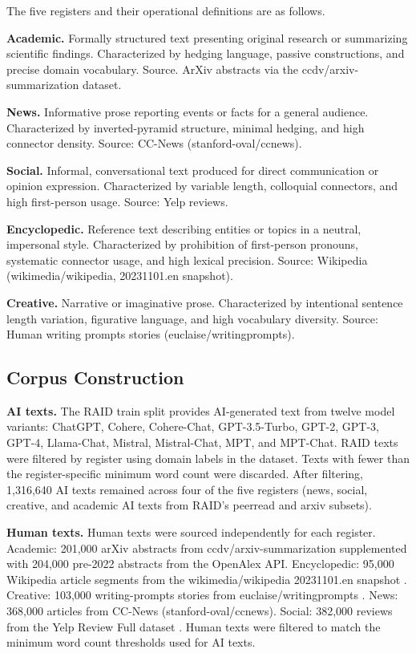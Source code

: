 \documentclass{article}
\begin{document}
The five registers and their operational definitions are as follows.

\textbf{Academic.} Formally structured text presenting original research or summarizing scientific findings. Characterized by hedging language, passive constructions, and precise domain vocabulary. Source. ArXiv abstracts via the ccdv/arxiv-summarization dataset.

\textbf{News.} Informative prose reporting events or facts for a general audience. Characterized by inverted-pyramid structure, minimal hedging, and high connector density. Source: CC-News (stanford-oval/ccnews).

\textbf{Social.} Informal, conversational text produced for direct communication or opinion expression. Characterized by variable length, colloquial connectors, and high first-person usage. Source: Yelp reviews.

\textbf{Encyclopedic.} Reference text describing entities or topics in a neutral, impersonal style. Characterized by prohibition of first-person pronouns, systematic connector usage, and high lexical precision. Source: Wikipedia (wikimedia/wikipedia, 20231101.en snapshot).

\textbf{Creative.} Narrative or imaginative prose. Characterized by intentional sentence length variation, figurative language, and high vocabulary diversity. Source: Human writing prompts stories (euclaise/writingprompts).

\subsection{Corpus Construction}

\textbf{AI texts.} The RAID train split \cite{ref4} provides AI-generated text from twelve model variants: ChatGPT, Cohere, Cohere-Chat, GPT-3.5-Turbo, GPT-2, GPT-3, GPT-4, Llama-Chat, Mistral, Mistral-Chat, MPT, and MPT-Chat. RAID texts were filtered by register using domain labels in the dataset. Texts with fewer than the register-specific minimum word count were discarded. After filtering, 1,316,640 AI texts remained across four of the five registers (news, social, creative, and academic AI texts from RAID's peerread and arxiv subsets).

\textbf{Human texts.} Human texts were sourced independently for each register. Academic: 201,000 arXiv abstracts from ccdv/arxiv-summarization \cite{ref15} supplemented with 204,000 pre-2022 abstracts from the OpenAlex API. Encyclopedic: 95,000 Wikipedia article segments from the wikimedia/wikipedia 20231101.en snapshot \cite{ref16}. Creative: 103,000 writing-prompts stories from euclaise/writingprompts \cite{ref17}. News: 368,000 articles from CC-News (stanford-oval/ccnews). Social: 382,000 reviews from the Yelp Review Full dataset \cite{ref18}. Human texts were filtered to match the minimum word count thresholds used for AI texts.
\end{document}
